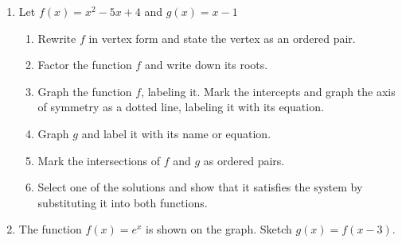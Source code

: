 \documentclass[]{book}
\begin{document}
\begin{enumerate}
\newpage
\item Let $f(x) = x^2 -5x +4$ and $g(x)=x-1$
\begin{enumerate}
    \item Rewrite $f$ in vertex form and state the vertex as an ordered pair.
    \item Factor the function $f$ and write down its roots.
    \item Graph the function $f$, labeling it. Mark the intercepts and graph the axis of symmetry as a dotted line, labeling it with its equation.
    \item Graph $g$ and label it with its name or equation.
    \item Mark the intersections of $f$ and $g$ as ordered pairs.
    \item Select one of the solutions and show that it satisfies the system by substituting it into both functions.
\end{enumerate}


\begin{figure}[!htbp]
\begin{center}
\end{center}
\end{figure}

\newpage

\item The function $f(x)=e^x$ is shown on the graph. Sketch $g(x)=f(x-3)$.

\begin{figure}[!htbp]
\begin{center}
\begin{tikzpicture}


\end{tikzpicture}
\end{center}
\end{figure}
\end{enumerate}
\end{document}
